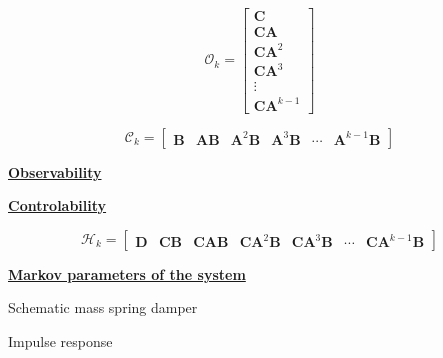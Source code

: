 \documentclass[aspectratio=169, usenames, dvipsnames]{beamer}
\begin{document}
\begin{frame}%
  \vfill

  \begin{minipage}{.28\textwidth}
    \Large

    \[
    \mathcal{O}_k
    =
    \begin{bmatrix}
      \bm{C} \\ \bm{CA} \\ \bm{CA}^2 \\ \bm{CA}^3 \\ \vdots \\ \bm{CA}^{k-1}
    \end{bmatrix}
    \]
  \end{minipage}%
  \hfill
  \begin{minipage}{.68\textwidth}
    \Large

    \[
    \mathcal{C}_k
    =
    \begin{bmatrix}
      \bm{B} & \bm{AB} & \bm{A}^2 \bm{B} & \bm{A}^3 \bm{B} & \cdots & \bm{A}^{k-1} \bm{B}
    \end{bmatrix}
    \]
  \end{minipage}

  \vfill

  \begin{minipage}{.28\textwidth}
    \centering
    \underline{\textbf{Observability}}
  \end{minipage}%
  \hfill
  \begin{minipage}{.68\textwidth}
    \centering
    \underline{\textbf{Controlability}}
  \end{minipage}

  \vfill
\end{frame}

\begin{frame}
  \centering
  \vfill

  {\Large
  \[
    \mathcal{H}_k
    =
    \begin{bmatrix}
      \bm{D} & \bm{CB} & \bm{CAB} & \bm{CA}^2\bm{B} & \bm{CA}^3 \bm{B} & \cdots & \bm{CA}^{k-1} \bm{B}
    \end{bmatrix}
  \]
  }

  \bigskip

  \underline{\textbf{Markov parameters of the system}}

  \vfill
\end{frame}

\begin{frame}
  \vfill

  \begin{minipage}{.28\textwidth}
    Schematic mass spring damper
  \end{minipage}%
  \hfill
  \begin{minipage}{.68\textwidth}
    Impulse response
  \end{minipage}

  \vfill
\end{frame}
\end{document}

